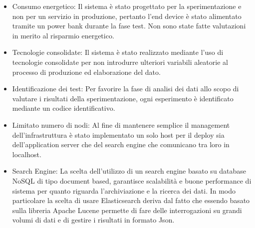 \documentclass[12pt,a4paper,openright,twoside]{report}
\begin{document}
\begin{itemize}
\item Consumo energetico: Il sistema \`e stato progettato per la sperimentazione e non per un servizio in produzione, pertanto l'end device \`e stato alimentato tramite un power bank durante la fase test. Non sono state fatte valutazioni in merito al risparmio energetico.
\item Tecnologie consolidate: Il sistema \`e stato realizzato mediante l'uso di tecnologie consolidate per non introdurre ulteriori variabili aleatorie al processo di produzione ed elaborazione del dato. 
\item Identificazione dei test: Per favorire la fase di analisi dei dati allo scopo di valutare i risultati della sperimentazione, ogni esperimento \`e identificato mediante un codice identificativo. 
\item Limitato numero di nodi: Al fine di mantenere semplice il management dell'infrastruttura \`e stato implementato un solo host per il deploy sia dell'application server che del search engine che comunicano tra loro in localhost.   
\item Search Engine: La scelta dell'utilizzo di un search engine basato su database NoSQL di tipo document based, garantisce scalabilit\`a e buone performance di sistema per quanto riguarda l'archiviazione e la ricerca dei dati. In modo particolare la scelta di usare Elasticsearch deriva dal fatto che essendo basato sulla libreria Apache Lucene permette di fare delle interrogazioni su grandi volumi di dati e di gestire i risultati in formato Json.
\end{itemize}
 
\end{document}
